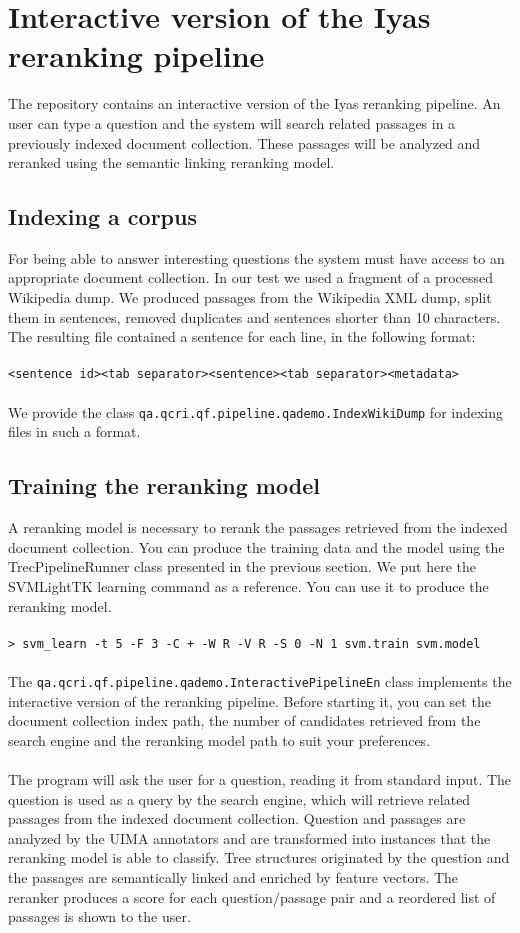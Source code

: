 \documentclass{wileysev}
\begin{document}
\section{Interactive version of the Iyas reranking pipeline}

The repository contains an interactive version of the Iyas reranking pipeline. An user can type a question and the system will search related passages in a previously indexed document collection. These passages will be analyzed and reranked using the semantic linking reranking model.

\subsection{Indexing a corpus}
For being able to answer interesting questions the system must have access to an appropriate document collection. In our test we used a fragment of a processed Wikipedia dump. We produced passages from the Wikipedia XML dump, split them in sentences, removed duplicates and sentences shorter than 10 characters. The resulting file contained a sentence for each line, in the following format:
\\\\
\texttt{\small{<sentence id><tab separator><sentence><tab separator><metadata>}}
\\\\
We provide the class \texttt{qa.qcri.qf.pipeline.qademo.IndexWikiDump} for indexing files in such a format.
\subsection{Training the reranking model}
A reranking model is necessary to rerank the passages retrieved from the indexed document collection. You can produce the training data and the model using the TrecPipelineRunner class presented in the previous section. We put here the SVMLightTK learning command as a reference. You can use it to produce the reranking model.
\\\\
\texttt{\small{> svm\_learn -t 5 -F 3 -C + -W R -V R -S 0 -N 1 svm.train svm.model}}
\\\\
The \texttt{qa.qcri.qf.pipeline.qademo.InteractivePipelineEn} class implements the interactive version of the reranking pipeline. Before starting it, you can set the document collection index path, the number of candidates retrieved from the search engine and the reranking model path to suit your preferences.
\\\\
The program will ask the user for a question, reading it from standard input. The question is used as a query by the search engine, which will retrieve related passages from the indexed document collection. Question and passages are analyzed by the UIMA annotators and are transformed into instances that the reranking model is able to classify. Tree structures originated by the question and the passages are semantically linked and enriched by feature vectors. The reranker produces a score for each question/passage pair and a reordered list of passages is shown to the user.
\end{document}
